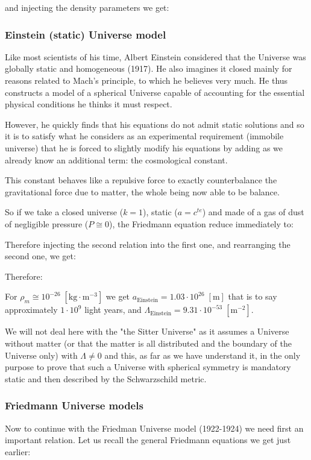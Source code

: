 	and injecting the density parameters we get:
	
	
	\subsubsection{Einstein (static) Universe model}\label{einstein static universe model}
	Like most scientists of his time, Albert Einstein considered that the Universe was globally static and homogeneous (1917). He also imagines it closed mainly for reasons related to Mach's principle, to which he believes very much. He thus constructs a model of a spherical Universe capable of accounting for the essential physical conditions he thinks it must respect.

	However, he quickly finds that his equations do not admit static solutions and so it is to satisfy what he considers as an experimental requirement (immobile universe) that he is forced to slightly modify his equations by adding as we already know an additional term: the cosmological constant.

	This constant behaves like a repulsive force to exactly counterbalance the gravitational force due to matter, the whole being now able to be balance.
	
	So if we take a closed universe ($k=1$), static ($a=c^{te}$) and made of a gas of dust of negligible pressure ($P\cong 0$), the Friedmann equation reduce immediately to:
	
	Therefore injecting the second relation into the first one, and rearranging the second one, we get:
	
	Therefore:
	
	For $\rho_m\cong 10^{-26}\;[\text{kg}\cdot\text{m}^{-3}]$ we get $a_\text{Einstein}=1.03\cdot 10^{26}\;[\text{m}]$ that is to say approximately $1\cdot 10^9$ light years, and $\Lambda_\text{Einstein}=9.31\cdot 10^{-53}\;[\text{m}^{-2}]$.
	\begin{tcolorbox}[title=Remark,colframe=black,arc=10pt]
	We will not deal here with the "the Sitter Universe" as it assumes a Universe without matter (or that the matter is all distributed and the boundary of the Universe only) with $\Lambda \neq 0$ and this, as far as we have understand it, in the only purpose to prove that such a Universe with spherical symmetry is mandatory static and then described by the Schwarzschild metric.
	\end{tcolorbox}
	
	\subsubsection{Friedmann Universe models}
	Now to continue with the Friedman Universe model (1922-1924) we need first an important relation. Let us recall the general Friedmann equations we get just earlier:
	
